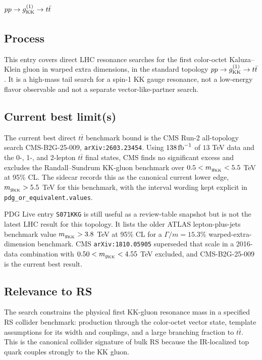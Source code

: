 
\section{\texorpdfstring{\(pp \to g^{(1)}_{\rm KK}\to t\bar t\)}{pp to KK gluon to ttbar}}

\subsection*{Process}
This entry covers direct LHC resonance searches for the first color-octet
Kaluza--Klein gluon in warped extra dimensions, in the standard topology
\(pp\to g^{(1)}_{\rm KK}\to t\bar t\).  It is a high-mass tail search for a
spin-1 KK gauge resonance, not a low-energy flavor observable and not a
separate vector-like-partner search.

\subsection*{Current best limit(s)}
The current best direct \(t\bar t\) benchmark bound is the CMS Run-2
all-topology search CMS-B2G-25-009, \texttt{arXiv:2603.23454}.  Using
\(138\,{\rm fb}^{-1}\) of \(13\) TeV data and the 0-, 1-, and 2-lepton
\(t\bar t\) final states, CMS finds no significant excess and excludes the
Randall--Sundrum KK-gluon benchmark over \(0.5<m_{g_{\rm KK}}<5.5\) TeV at
95\% CL.  The sidecar records this as the canonical current lower edge,
\(m_{g_{\rm KK}}>5.5\) TeV for this benchmark, with the interval wording kept
explicit in \texttt{pdg\_or\_equivalent.values}.

PDG Live entry \texttt{S071KKG} is still useful as a review-table snapshot but
is not the latest LHC result for this topology.  It lists the older
ATLAS lepton-plus-jets benchmark value \(m_{g_{\rm KK}}>3.8\) TeV at 95\% CL
for a \(\Gamma/m=15.3\%\) warped-extra-dimension benchmark.  CMS
\texttt{arXiv:1810.05905} superseded that scale in a 2016-data combination
with \(0.50<m_{g_{\rm KK}}<4.55\) TeV excluded, and CMS-B2G-25-009 is the
current best result.

\subsection*{Relevance to RS}
The search constrains the physical first KK-gluon resonance mass in a specified
RS collider benchmark: production through the color-octet vector state,
template assumptions for its width and couplings, and a large branching
fraction to \(t\bar t\).  This is the canonical collider signature of bulk RS
because the IR-localized top quark couples strongly to the KK gluon.

